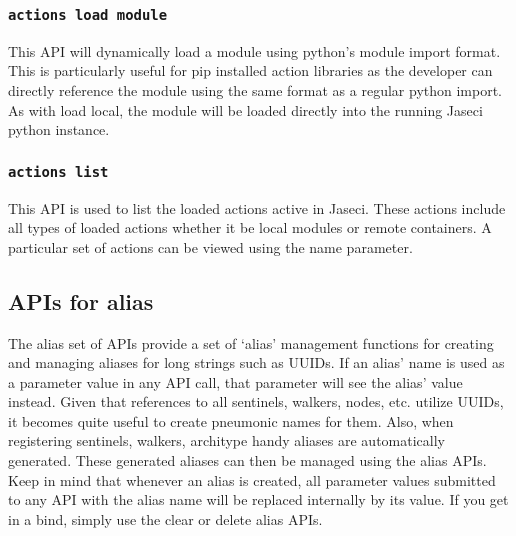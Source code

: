 \subsubsection{\lstinline[basicstyle=\Large\ttfamily]$actions load module$}

{This API will dynamically load a module using python's module import format.
This is particularly useful for pip installed action libraries as the developer
can directly reference the module using the same format as a regular python
import. As with load local, the module will be loaded directly into the running
Jaseci python instance.\vspace{4mm}\par
{}}
\subsubsection{\lstinline[basicstyle=\Large\ttfamily]$actions list$}

{This API is used to list the loaded actions active in Jaseci. These actions
include all types of loaded actions whether it be local modules or remote
containers. A particular set of actions can be viewed using the name parameter.\vspace{4mm}\par
{}}
\subsection{APIs for alias}

\par
The alias set of APIs provide a set of `alias' management functions for
creating and managing aliases for long strings such as UUIDs. If an alias'
name is used as a parameter value in any API call, that parameter will see
the alias' value instead. Given that references to all sentinels, walkers,
nodes, etc. utilize UUIDs, it becomes quite useful to create pneumonic
names for them. Also, when registering   sentinels, walkers, architype
handy aliases are automatically generated. These generated aliases can
then be managed using the alias APIs. Keep in mind that whenever an alias
is created, all parameter values submitted to any API with the alias name
will be replaced internally by its value. If you get in a bind, simply use
the clear or delete alias APIs.

